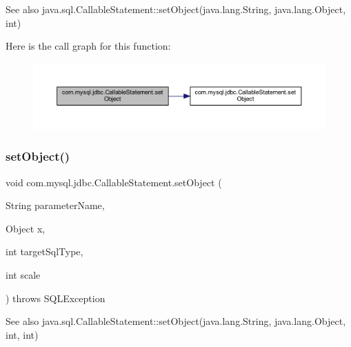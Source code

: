 \begin{DoxySeeAlso}{See also}
java.\+sql.\+Callable\+Statement\+::set\+Object(java.\+lang.\+String, java.\+lang.\+Object, int) 
\end{DoxySeeAlso}
Here is the call graph for this function\+:\nopagebreak
\begin{figure}[H]
\begin{center}
\leavevmode
\includegraphics[width=350pt]{classcom_1_1mysql_1_1jdbc_1_1_callable_statement_aad9b3a4c4845fc215c595ea6f9adebfd_cgraph}
\end{center}
\end{figure}
\mbox{\label{classcom_1_1mysql_1_1jdbc_1_1_callable_statement_a36eb0517921dbe1e680ab46705268c42}} 
\subsubsection{\texorpdfstring{set\+Object()}{setObject()}\hspace{0.1cm}{\footnotesize\ttfamily [3/3]}}
{\footnotesize\ttfamily void com.\+mysql.\+jdbc.\+Callable\+Statement.\+set\+Object (\begin{DoxyParamCaption}\item[{String}]{parameter\+Name,  }\item[{Object}]{x,  }\item[{int}]{target\+Sql\+Type,  }\item[{int}]{scale }\end{DoxyParamCaption}) throws S\+Q\+L\+Exception}

\begin{DoxySeeAlso}{See also}
java.\+sql.\+Callable\+Statement\+::set\+Object(java.\+lang.\+String, java.\+lang.\+Object, int, int) 
\end{DoxySeeAlso}
\mbox{\label{classcom_1_1mysql_1_1jdbc_1_1_callable_statement_a715ea2ed1e9bc4a7bb46c9f9365ffa1b}} 
